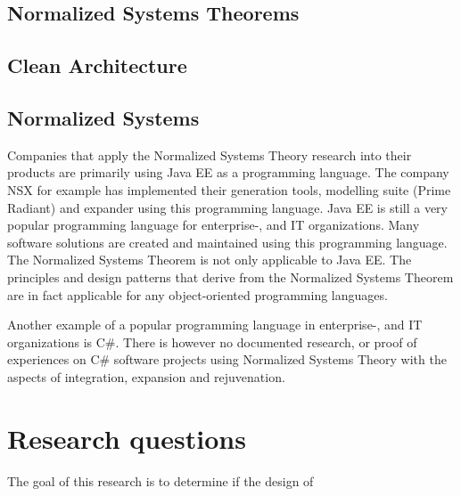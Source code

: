 \subsection{Normalized Systems Theorems}
\lipsum[1-1]

\subsection{Clean Architecture}
\lipsum[1-1]

\subsection{Normalized Systems}
Companies that apply the Normalized Systems Theory research into their products are
primarily using Java EE as a programming language. The company NSX for example has
implemented their generation tools, modelling suite (Prime Radiant) and expander using
this programming language. Java EE is still a very popular programming language for
enterprise-, and IT organizations. Many software solutions are created and maintained
using this programming language. The Normalized Systems Theorem is not only applicable to
Java EE. The principles and design patterns that derive from the Normalized Systems
Theorem are in fact applicable for any object-oriented programming languages. 

Another example of a popular programming language in enterprise-, and IT organizations is
C\#. There is however no documented research, or proof of experiences on C\# software
projects using Normalized Systems Theory with the aspects of integration, expansion and
rejuvenation.

\section{Research questions} \label{research_questions}
The goal of this research is to determine if the design of 